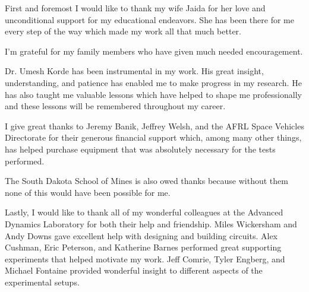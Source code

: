 First and foremost I would like to thank my wife Jaida for her love and unconditional support for my educational endeavors. She has been there for me every step of the way which made my work all that much better.

I'm grateful for my family members who have given much needed encouragement.

Dr. Umesh Korde has been instrumental in my work. His great insight, understanding, and patience has enabled me to make progress in my research. He has also taught me valuable lessons which have helped to shape me professionally and these lessons will be remembered throughout my career.

I give great thanks to Jeremy Banik, Jeffrey Welsh, and the AFRL Space Vehicles Directorate for their generous financial support which, among many other things, has helped purchase equipment that was absolutely necessary for the tests performed.

The South Dakota School of Mines is also owed thanks because without them none of this would have been possible for me.

Lastly, I would like to thank all of my wonderful colleagues at the Advanced Dynamics Laboratory for both their help and friendship. Miles Wickersham and Andy Downs gave excellent help with designing and building circuits. Alex Cushman, Eric Peterson, and Katherine Barnes performed great supporting experiments that helped motivate my work. Jeff Comrie, Tyler Engberg, and Michael Fontaine provided wonderful insight to different aspects of the experimental setups.
